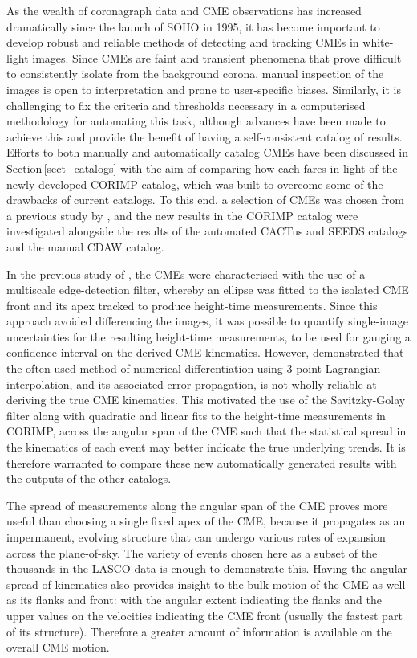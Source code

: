 \documentclass[referee,a4paper,12pt,traditabstract]{swsc}
\begin{document}
As the wealth of coronagraph data and CME observations has increased dramatically since the launch of SOHO in 1995, it has become important to develop robust and reliable methods of detecting and tracking CMEs in white-light images. Since CMEs are faint and transient phenomena that prove difficult to consistently isolate from the background corona, manual inspection of the images is open to interpretation and prone to user-specific biases. Similarly, it is challenging to fix the criteria and thresholds necessary in a computerised methodology for automating this task, although advances have been made to achieve this and provide the benefit of having a self-consistent catalog of results. Efforts to both manually and automatically catalog CMEs have been discussed in Section\,\ref{sect_catalogs} with the aim of comparing how each fares in light of the newly developed CORIMP catalog, which was built to overcome some of the drawbacks of current catalogs. To this end, a selection of CMEs was chosen from a previous study by \cite{2009A&A...495..325B}, and the new results in the CORIMP catalog were investigated alongside the results of the automated CACTus and SEEDS catalogs and the manual CDAW catalog. 

In the previous study of \cite{2009A&A...495..325B}, the CMEs were characterised with the use of a multiscale edge-detection filter, whereby an ellipse was fitted to the isolated CME front and its apex tracked to produce height-time measurements. Since this approach avoided differencing the images, it was possible to quantify single-image uncertainties for the resulting height-time measurements, to be used for gauging a confidence interval on the derived CME kinematics. However, \cite{2013A&A...557A..96B} demonstrated that the often-used method of numerical differentiation using 3-point Lagrangian interpolation, and its associated error propagation, is not wholly reliable at deriving the true CME kinematics. This motivated the use of the Savitzky-Golay filter along with quadratic and linear fits to the height-time measurements in CORIMP, across the angular span of the CME such that the statistical spread in the kinematics of each event may better indicate the true underlying trends. It is therefore warranted to compare these new automatically generated results with the outputs of the other catalogs.

The spread of measurements along the angular span of the CME proves more useful than choosing a single fixed apex of the CME, because it propagates as an impermanent, evolving structure that can undergo various rates of expansion across the plane-of-sky. The variety of events chosen here as a subset of the thousands in the LASCO data is enough to demonstrate this. Having the angular spread of kinematics also provides insight to the bulk motion of the CME as well as its flanks and front: with the angular extent indicating the flanks and the upper values on the velocities indicating the CME front (usually the fastest part of its structure). Therefore a greater amount of information is available on the overall CME motion.
\end{document}
